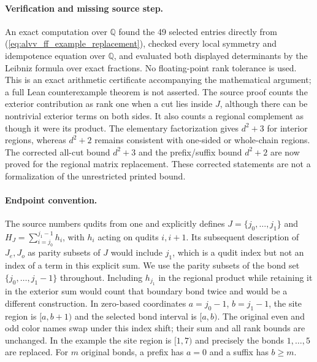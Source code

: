 \documentclass{article}
\begin{document}
\paragraph{Verification and missing source step.}
An exact computation over $\mathbb Q$ found the
49 selected entries directly from (\ref{eq:alvv_ff_example_replacement}),
checked every local symmetry and idempotence equation over $\mathbb Q$,
and evaluated both displayed determinants by the Leibniz formula over
exact fractions. No floating-point rank tolerance is used. This is
an exact arithmetic certificate accompanying the mathematical argument;
a full Lean counterexample theorem is not asserted.
The source proof counts the exterior contribution as rank one when a cut
lies inside $J$, although there can be nontrivial exterior terms on both
sides. It also counts a regional complement as though it were its product.
The elementary factorization gives $d^2+3$ for interior regions, whereas
$d^2+2$ remains consistent with one-sided or whole-chain regions.
The corrected all-cut bound $d^2+3$ and the prefix/suffix bound $d^2+2$
are now proved for the regional matrix replacement. These corrected
statements are not a formalization of the unrestricted printed bound.

\paragraph{Endpoint convention.}
The source numbers qudits from one and explicitly defines
$J=\{j_0,\ldots,j_1\}$ and
$H_J=\sum_{i=j_0}^{j_1-1}h_i$, with $h_i$ acting on qudits $i,i+1$.
Its subsequent description of $J_e,J_o$ as parity subsets of $J$ would
include $j_1$, which is a qudit index but not an index of a term in this
explicit sum. We use the parity subsets of the bond set
$\{j_0,\ldots,j_1-1\}$ throughout. Including $h_{j_1}$ in the
regional product while retaining it in the exterior sum would count that
boundary bond twice and would be a different construction.
In zero-based coordinates $a=j_0-1$, $b=j_1-1$, the site region is
$\lbrack a,b+1)$ and the selected bond interval is $\lbrack a,b)$.
The original even and odd color names swap under this index shift;
their sum and all rank bounds are unchanged. In the example the site
region is $\lbrack1,7)$ and precisely the bonds $1,\ldots,5$ are replaced.
For $m$ original bonds, a prefix has $a=0$ and a suffix has $b\ge m$.
\end{document}
